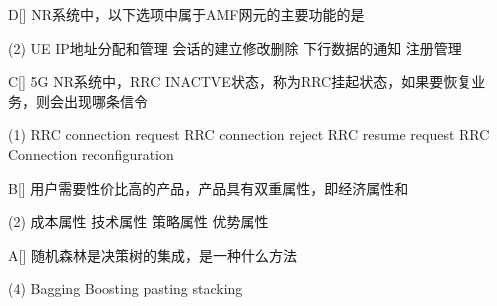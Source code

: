 \begin{choice}{D}[]
    NR系统中，以下选项中属于AMF网元的主要功能的是
    \begin{tasks}(2)
        \task UE IP地址分配和管理
        \task 会话的建立修改删除
        \task 下行数据的通知
        \task 注册管理
    \end{tasks}
\end{choice}



\begin{choice}{C}[]
    5G NR系统中，RRC INACTVE状态，称为RRC挂起状态，如果要恢复业务，则会出现哪条信令
    \begin{tasks}(1)
        \task RRC connection request
        \task RRC connection reject
        \task RRC resume request
        \task RRC Connection reconfiguration
    \end{tasks}
\end{choice}

\begin{choice}{B}[]
    用户需要性价比高的产品，产品具有双重属性，即经济属性和
    \begin{tasks}(2)
        \task 成本属性
        \task 技术属性
        \task 策略属性
        \task 优势属性
    \end{tasks}
\end{choice}




\begin{choice}{A}[]
    随机森林是决策树的集成，是一种什么方法
    \begin{tasks}(4)
        \task Bagging
        \task Boosting
        \task pasting
        \task stacking
    \end{tasks}
\end{choice}


